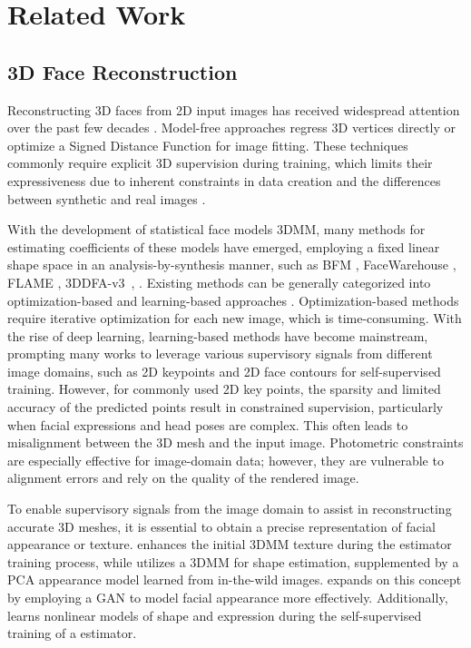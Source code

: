 \section{Related Work}
\subsection{3D Face Reconstruction}
Reconstructing 3D faces from 2D input images has received widespread attention over the past few decades \cite{STATEOF3D}.
Model-free approaches \cite{retinaface, dou2017end, feng2018joint, wu2020unsupervised, ruan2021sadrnet} regress 3D vertices directly or optimize a Signed Distance Function \cite{SDF} for image fitting.
These techniques commonly require explicit 3D supervision during training, which limits their expressiveness due to inherent constraints in data creation and the differences between synthetic and real images \cite{dou2017end, zeng2019df2net}.

With the development of statistical face models 3DMM, many methods for estimating coefficients of these models have emerged, employing a fixed linear shape space in an analysis-by-synthesis manner, such as BFM \cite{BFM}, FaceWarehouse \cite{Facewarehouse}, FLAME \cite{li2017learning}, 3DDFA-v3~\cite{wang20243d}, \etc. Existing methods can be generally categorized into optimization-based \cite{aldrian2012inverse, bas2017fitting} and learning-based approaches \cite{ExpNet, inversefacenet, zielonka2022towards}.
Optimization-based methods require iterative optimization for each new image, which is time-consuming. With the rise of deep learning, learning-based methods have become mainstream, prompting many works to leverage various supervisory signals from different image domains, such as 2D keypoints \cite{facescape, Deep3DReconstruct, shang2020self} and 2D face contours \cite{counter} for self-supervised training. However, for commonly used 2D key points, the sparsity and limited accuracy of the predicted points result in constrained supervision, particularly when facial expressions and head poses are complex. This often leads to misalignment between the 3D mesh and the input image. Photometric constraints are especially effective for image-domain data; however, they are vulnerable to alignment errors and rely on the quality of the rendered image.

To enable supervisory signals from the image domain to assist in reconstructing accurate 3D meshes, it is essential to obtain a precise representation of facial appearance or texture. \cite{lin2020towards} enhances the initial 3DMM texture during the estimator training process, while \cite{booth20183d} utilizes a 3DMM for shape estimation, supplemented by a PCA appearance model learned from in-the-wild images. \cite{gecer2019ganfit} expands on this concept by employing a GAN to model facial appearance more effectively. Additionally, \cite{tewari2021learning, tran2019towards} learns nonlinear models of shape and expression during the self-supervised training of a estimator.

